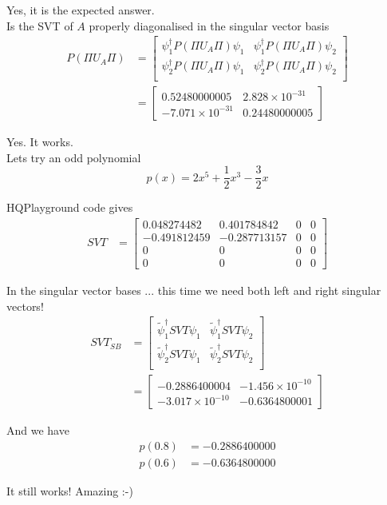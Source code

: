 \documentclass{article}
\begin{document}
\noindent Yes, it is the expected answer.\\

\noindent Is the SVT of $A$ properly diagonalised in the singular vector basis
\begin{align*}
P(\Pi U_A \Pi)  & = \begin{bmatrix}
			{\psi}_1^{\dagger} P(\Pi U_A \Pi) \psi_1 & {\psi}_1^{\dagger} P(\Pi U_A \Pi) \psi_2 \\ 
			{\psi}_2^{\dagger} P(\Pi U_A \Pi) \psi_1 & {\psi}_2^{\dagger} P(\Pi U_A \Pi) \psi_2 \\
		\end{bmatrix}\\
	& = \begin{bmatrix}
0.52480000005 & 2.828 \times 10^{-31} \\
-7.071 \times 10^{-31} & 0.24480000005
\end{bmatrix}
\end{align*}

\noindent Yes. It works.\\

\noindent Lets try an odd polynomial
$$
p(x) = 2x^5 + \frac{1}{2}x^3 - \frac{3}{2}x
$$

\noindent HQPlayground code gives 
\begin{align*}
SVT   & = \begin{bmatrix}
0.048274482 & 0.401784842 & 0 & 0 \\
-0.491812459 & -0.287713157 & 0 & 0 \\
0 & 0 & 0 & 0 \\
0 & 0 & 0 & 0
\end{bmatrix}
\end{align*}

\noindent In the singular vector bases ... this time we need both left and right singular vectors!
\begin{align*}
SVT_{SB}  & = \begin{bmatrix}
			\tilde{\psi}_1^{\dagger} SVT \psi_1 & \tilde{\psi}_1^{\dagger} SVT \psi_2 \\ 
			\tilde{\psi}_2^{\dagger} SVT \psi_1 & \tilde{\psi}_2^{\dagger} SVT \psi_2 \\
		\end{bmatrix}\\
	& = \begin{bmatrix}
-0.2886400004 & -1.456 \times 10^{-10} \\
-3.017 \times 10^{-10} & -0.6364800001
\end{bmatrix}
\end{align*}

\noindent And we have 
\begin{align*}
p(0.8) & = -0.2886400000\\
p(0.6) & = -0.6364800000
\end{align*}

\noindent It still works! Amazing :-)
\end{document}
